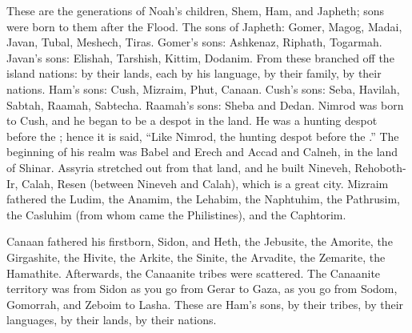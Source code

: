 
\begin{inparaenum}
   These are the generations of Noah's children, Shem, Ham, and Japheth; sons were born to them after the Flood.%
   The sons of Japheth: Gomer, Magog, Madai, Javan, Tubal, Meshech, Tiras.%
   Gomer's sons: Ashkenaz, Riphath, Togarmah.%
   Javan's sons: Elishah, Tarshish, Kittim, Dodanim.%
   From these branched off the island nations: by their lands, each by his language, by their family, by their nations.%
   Ham's sons: Cush, Mizraim, Phut, Canaan.%
   Cush's sons: Seba, Havilah, Sabtah, Raamah, Sabtecha. Raamah's sons: Sheba and Dedan.%
   Nimrod was born to Cush, and he began to be a despot in the land.%
   He was a hunting despot before the \lord; hence it is said, ``Like Nimrod, the hunting despot before the \lord.''%
   The beginning of his realm was Babel and Erech and Accad and Calneh, in the land of Shinar.%
   Assyria stretched out from that land, and he built Nineveh, Rehoboth-Ir, Calah,%
   Resen (between Nineveh and Calah), which is a great city.%
   Mizraim fathered the Ludim, the Anamim, the Lehabim, the Naphtuhim,%
   the Pathrusim, the Casluhim (from whom came the Philistines), and the Caphtorim.%
  
   Canaan fathered his firstborn, Sidon, and Heth,%
   the Jebusite, the Amorite, the Girgashite,%
   the Hivite, the Arkite, the Sinite,%
   the Arvadite, the Zemarite, the Hamathite. Afterwards, the Canaanite tribes were scattered.%
   The Canaanite territory was from Sidon as you go from Gerar to Gaza, as you go from Sodom, Gomorrah, and Zeboim to Lasha.%
   These are Ham's sons, by their tribes, by their languages, by their lands, by their nations.%
  

\end{inparaenum}
